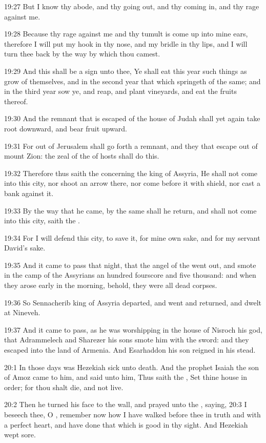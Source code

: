 19:27 But I know thy abode, and thy going out, and thy coming in, and
thy rage against me.

19:28 Because thy rage against me and thy tumult is come up into mine
ears, therefore I will put my hook in thy nose, and my bridle in thy
lips, and I will turn thee back by the way by which thou camest.

19:29 And this shall be a sign unto thee, Ye shall eat this year such
things as grow of themselves, and in the second year that which
springeth of the same; and in the third year sow ye, and reap, and
plant vineyards, and eat the fruits thereof.

19:30 And the remnant that is escaped of the house of Judah shall yet
again take root downward, and bear fruit upward.

19:31 For out of Jerusalem shall go forth a remnant, and they that
escape out of mount Zion: the zeal of the \LORD of hosts shall do this.

19:32 Therefore thus saith the \LORD concerning the king of Assyria, He
shall not come into this city, nor shoot an arrow there, nor come
before it with shield, nor cast a bank against it.

19:33 By the way that he came, by the same shall he return, and shall
not come into this city, saith the \LORD.

19:34 For I will defend this city, to save it, for mine own sake, and
for my servant David's sake.

19:35 And it came to pass that night, that the angel of the \LORD went
out, and smote in the camp of the Assyrians an hundred fourscore and
five thousand: and when they arose early in the morning, behold, they
were all dead corpses.

19:36 So Sennacherib king of Assyria departed, and went and returned,
and dwelt at Nineveh.

19:37 And it came to pass, as he was worshipping in the house of
Nisroch his god, that Adrammelech and Sharezer his sons smote him with
the sword: and they escaped into the land of Armenia. And Esarhaddon
his son reigned in his stead.

20:1 In those days was Hezekiah sick unto death. And the prophet
Isaiah the son of Amoz came to him, and said unto him, Thus saith the
\LORD, Set thine house in order; for thou shalt die, and not live.

20:2 Then he turned his face to the wall, and prayed unto the \LORD,
saying, 20:3 I beseech thee, O \LORD, remember now how I have walked
before thee in truth and with a perfect heart, and have done that
which is good in thy sight. And Hezekiah wept sore.

